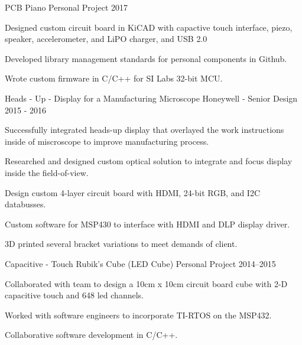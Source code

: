 \documentclass[]{bergman-cv} %
\begin{document}
\begin{entrylist}
\entryFourItem
{PCB Piano}
{Personal Project}
{2017}
{\begin{itemizenosep}
	\item Designed custom circuit board in KiCAD with capactive touch interface, piezo, speaker, accelerometer, and LiPO charger, and USB 2.0
	\item Developed library management standards for personal components in Github.
	\item Wrote custom firmware in C/C++ for SI Labs 32-bit MCU.
\end{itemizenosep}}
\entryFourItem
{Heads - Up - Display for a Manufacturing Microscope}
{Honeywell - Senior Design}
{2015 - 2016}
{\begin{itemizenosep}
	\item Successfully integrated heads-up display that overlayed the work instructions inside of miscroscope to improve manufacturing process.
	\item Researched and designed custom optical solution to integrate and focus display inside the field-of-view.
	\item Design custom 4-layer circuit board	with HDMI, 24-bit RGB, and I2C databusses.
	\item Custom software for MSP430 to interface with HDMI and DLP display driver.
	\item 3D printed several bracket variations to meet demands of client.
\end{itemizenosep}}
\entryFourItem
{Capacitive - Touch Rubik's Cube (LED Cube)}
{Personal Project}
{2014--2015}
{\begin{itemizenosep}
	\item Collaborated with team to design a 10cm x 10cm circuit board cube with 2-D capacitive touch and 648 led channels.
	\item Worked with software engineers to incorporate TI-RTOS on the MSP432.
	\item Collaborative software development in C/C++.

\end{itemizenosep}}
\end{entrylist}
\end{document}
